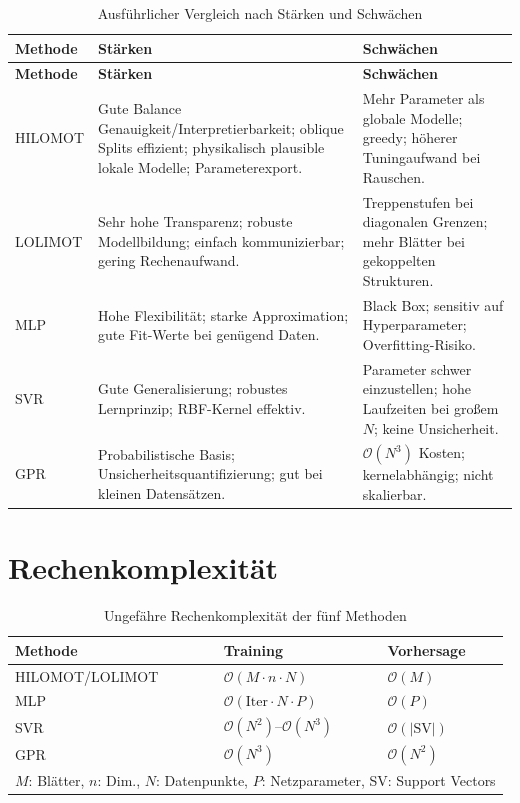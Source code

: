 \documentclass[11pt,a4paper]{report}
\begin{document}
\begin{longtable}{p{2.2cm}p{5.0cm}p{5.5cm}}
\caption{Ausf\"{u}hrlicher Vergleich nach St\"{a}rken und Schw\"{a}chen}
\label{tab:methoden_vergleich} \\
\toprule
\textbf{Methode} & \textbf{St\"{a}rken} & \textbf{Schw\"{a}chen} \\
\midrule
\endfirsthead
\toprule
\textbf{Methode} & \textbf{St\"{a}rken} & \textbf{Schw\"{a}chen} \\
\midrule
\endhead
HILOMOT & Gute Balance Genauigkeit/Interpretierbarkeit; oblique Splits effizient; physikalisch plausible lokale Modelle; Parameterexport. & Mehr Parameter als globale Modelle; greedy; h\"{o}herer Tuningaufwand bei Rauschen. \\[3pt]
LOLIMOT & Sehr hohe Transparenz; robuste Modellbildung; einfach kommunizierbar; gering Rechenaufwand. & Treppenstufen bei diagonalen Grenzen; mehr Bl\"{a}tter bei gekoppelten Strukturen. \\[3pt]
MLP & Hohe Flexibilit\"{a}t; starke Approximation; gute Fit-Werte bei gen\"{u}gend Daten. & Black Box; sensitiv auf Hyperparameter; Overfitting-Risiko. \\[3pt]
SVR & Gute Generalisierung; robustes Lernprinzip; RBF-Kernel effektiv. & Parameter schwer einzustellen; hohe Laufzeiten bei gro\ss{}em $N$; keine Unsicherheit. \\[3pt]
GPR & Probabilistische Basis; Unsicherheitsquantifizierung; gut bei kleinen Datens\"{a}tzen. & $\mathcal{O}(N^3)$ Kosten; kernelabh\"{a}ngig; nicht skalierbar. \\
\bottomrule
\end{longtable}

\section{Rechenkomplexit\"{a}t}

\begin{table}[H]
\centering
\caption{Ungef\"{a}hre Rechenkomplexit\"{a}t der f\"{u}nf Methoden}
\label{tab:rechenaufwand}
\begin{tabular}{lll}
\toprule
\textbf{Methode} & \textbf{Training} & \textbf{Vorhersage} \\
\midrule
HILOMOT/LOLIMOT & $\mathcal{O}(M \cdot n \cdot N)$ & $\mathcal{O}(M)$ \\
MLP             & $\mathcal{O}(\text{Iter} \cdot N \cdot P)$ & $\mathcal{O}(P)$ \\
SVR             & $\mathcal{O}(N^2)$--$\mathcal{O}(N^3)$ & $\mathcal{O}(|\text{SV}|)$ \\
GPR             & $\mathcal{O}(N^3)$ & $\mathcal{O}(N^2)$ \\
\bottomrule
\multicolumn{3}{l}{\small $M$: Bl\"{a}tter, $n$: Dim., $N$: Datenpunkte, $P$: Netzparameter, SV: Support Vectors}
\end{tabular}
\end{table}
\end{document}
